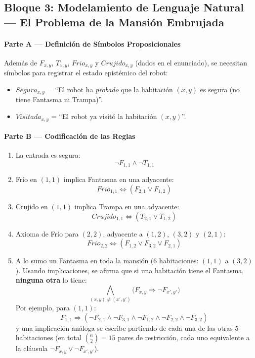 \subsection{Bloque 3: Modelamiento de Lenguaje Natural — El Problema de la Mansión Embrujada}

\paragraph{Parte A --- Definición de Símbolos Proposicionales}

Además de $F_{x,y}$, $T_{x,y}$, $Frio_{x,y}$ y $Crujido_{x,y}$ (dados en el enunciado), se necesitan
símbolos para registrar el estado epistémico del robot:
\begin{itemize}
    \item $Segura_{x,y}$ = ``El robot ha \emph{probado} que la habitación $(x,y)$ es segura (no tiene
    Fantasma ni Trampa)''.
    \item $Visitada_{x,y}$ = ``El robot ya visitó la habitación $(x,y)$''.
\end{itemize}

\paragraph{Parte B --- Codificación de las Reglas}

\begin{enumerate}
    \item La entrada es segura:
    \[
        \neg F_{1,1} \land \neg T_{1,1}
    \]

    \item Frío en $(1,1)$ implica Fantasma en una adyacente:
    \[
        Frio_{1,1} \Leftrightarrow (F_{2,1} \lor F_{1,2})
    \]

    \item Crujido en $(1,1)$ implica Trampa en una adyacente:
    \[
        Crujido_{1,1} \Leftrightarrow (T_{2,1} \lor T_{1,2})
    \]

    \item Axioma de Frío para $(2,2)$, adyacente a $(1,2)$, $(3,2)$ y $(2,1)$:
    \[
        Frio_{2,2} \Leftrightarrow (F_{1,2} \lor F_{3,2} \lor F_{2,1})
    \]

    \item A lo sumo un Fantasma en toda la mansión (6 habitaciones: $(1,1)$ a $(3,2)$). Usando
    implicaciones, se afirma que si una habitación tiene el Fantasma, \textbf{ninguna otra} lo tiene:
    \[
        \bigwedge_{(x,y) \neq (x',y')} \big(F_{x,y} \Rightarrow \neg F_{x',y'}\big)
    \]
    Por ejemplo, para $(1,1)$:
    \[
        F_{1,1} \Rightarrow (\neg F_{2,1} \land \neg F_{3,1} \land \neg F_{1,2} \land \neg F_{2,2}
        \land \neg F_{3,2})
    \]
    y una implicación análoga se escribe partiendo de cada una de las otras 5 habitaciones (en total
    $\binom{6}{2}=15$ pares de restricción, cada uno equivalente a la cláusula $\neg F_{x,y} \lor
    \neg F_{x',y'}$).
\end{enumerate}

